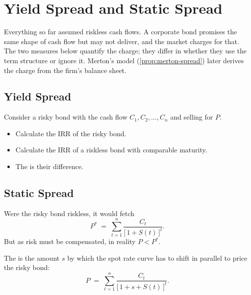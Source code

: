 \section{Yield Spread and Static Spread}
\label{sec:spreads}

\suppstart
Everything so far assumed riskless cash flows.
A corporate bond promises the same shape of cash flow but may not deliver, and the market charges for that.
The two measures below quantify the charge; they differ in whether they use the term structure or ignore it.
Merton's model (\autoref{prop:merton-spread}) later derives the charge from the firm's balance sheet.
\suppend

\subsection{Yield Spread}


Consider a risky bond with the cash flow $C_{1},C_{2},\ldots,C_{n}$ and selling for $P$.

\begin{itemize}[nosep]
	\item Calculate the IRR of the risky bond.
	\item Calculate the IRR of a riskless bond with comparable maturity.
	\item The  is their difference.
\end{itemize}

\subsection{Static Spread}


Were the risky bond riskless, it would fetch
\begin{equation}
	P^{*} \;=\; \sum_{t=1}^{n}\frac{C_{t}}{\bigl[\,1+S(t)\,\bigr]^{t}} . \label{eq:pstar}
\end{equation}
But as risk must be compensated, in reality $P < P^{*}$.

\begin{definition}
	The  is the amount $s$ by which the spot rate curve has to shift in parallel to price the risky bond:
	\begin{equation}
		P \;=\; \sum_{t=1}^{n}\frac{C_{t}}{\bigl[\,1+s+S(t)\,\bigr]^{t}} . \label{eq:static-spread}
	\end{equation}
\end{definition}

